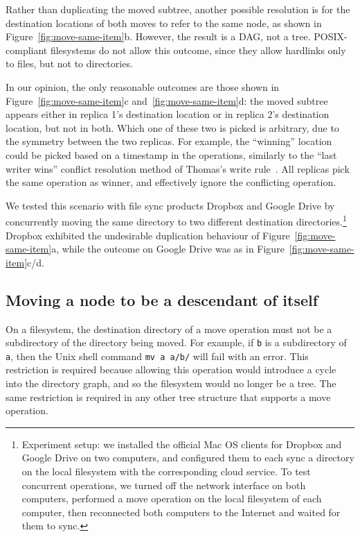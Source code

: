 \documentclass[sigconf]{acmart}
\begin{document}
Rather than duplicating the moved subtree, another possible resolution is for the destination locations of both moves to refer to the same node, as shown in Figure~\ref{fig:move-same-item}b.
However, the result is a DAG, not a tree.
POSIX-compliant filesystems do not allow this outcome, since they allow hardlinks only to files, but not to directories.

In our opinion, the only reasonable outcomes are those shown in Figure~\ref{fig:move-same-item}c and~\ref{fig:move-same-item}d: the moved subtree appears either in replica 1's destination location or in replica 2's destination location, but not in both.
Which one of these two is picked is arbitrary, due to the symmetry between the two replicas.
For example, the ``winning'' location could be picked based on a timestamp in the operations, similarly to the ``last writer wins'' conflict resolution method of Thomas's write rule~\cite{Johnson:1975we}.
All replicas pick the same operation as winner, and effectively ignore the conflicting operation.

We tested this scenario with file sync products Dropbox and Google Drive by concurrently moving the same directory to two different destination directories.\footnote{Experiment setup: we installed the official Mac OS clients for Dropbox and Google Drive on two computers, and configured them to each sync a directory on the local filesystem with the corresponding cloud service.
To test concurrent operations, we turned off the network interface on both computers, performed a move operation on the local filesystem of each computer, then reconnected both computers to the Internet and waited for them to sync.}
Dropbox exhibited the undesirable duplication behaviour of Figure~\ref{fig:move-same-item}a, while the outcome on Google Drive was as in Figure~\ref{fig:move-same-item}c/d.

\subsection{Moving a node to be a descendant of itself}\label{sec:move-cycle}

On a filesystem, the destination directory of a move operation must not be a subdirectory of the directory being moved.
For example, if \texttt{b} is a subdirectory of \texttt{a}, then the Unix shell command \texttt{mv a a/b/} will fail with an error.
This restriction is required because allowing this operation would introduce a cycle into the directory graph, and so the filesystem would no longer be a tree.
The same restriction is required in any other tree structure that supports a move operation.
\end{document}
